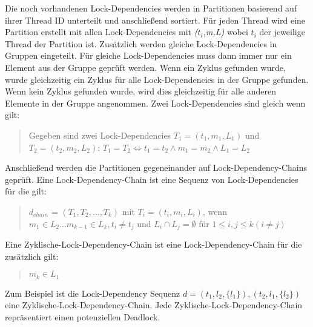 Die noch vorhandenen Lock-Dependencies werden in Partitionen basierend auf ihrer
Thread ID unterteilt und anschließend sortiert. Für jeden Thread wird eine
Partition erstellt mit allen Lock-Dependencies mit \textit{($t_i$,m,L)} wobei
\textit{$t_i$} der jeweilige Thread der Partition ist. Zusätzlich werden gleiche
Lock-Dependencies in Gruppen eingeteilt. Für gleiche Lock-Dependencies muss dann
immer nur ein Element aus der Gruppe geprüft werden. Wenn ein Zyklus gefunden
wurde, wurde gleichzeitig ein Zyklus für alle Lock-Dependencies in der Gruppe
gefunden. Wenn kein Zyklus gefunden wurde, wird dies gleichzeitig für alle
anderen Elemente in der Gruppe angenommen. Zwei Lock-Dependencies sind gleich
wenn gilt:
\begin{quote}
  Gegeben sind zwei Lock-Dependencies \textit{$T_1 = (t_1, m_1, L_1)$} und
  \textit{$T_2 = (t_2, m_2, L_2)$}: $T_1 = T_2 \Leftrightarrow t_1 = t_2 \land
  m_1 = m_2 \land L_1 = L_2 $
\end{quote}
Anschließend werden die Partitionen gegeneinander auf Lock-Dependency-Chains
geprüft. Eine Lock-Dependency-Chain ist eine Sequenz von Lock-Dependencies für
die gilt:
\begin{quote}
  \textbf{$d_{chain}$} = $(T_1, T_2, \dots , T_k)$ mit $T_i = (t_i, m_i, L_i)$,
  wenn $m_1 \in L_2 \dots m_{k-1} \in L_k, t_i \neq t_j$ und $L_i \cap L_j =
  \emptyset$ für $1 \leq i, j \leq k (i \neq j)$
\end{quote}
Eine Zyklische-Lock-Dependency-Chain ist eine Lock-Dependency-Chain für die
zusätzlich gilt:
\begin{quote}
  $m_k \in L_1$
\end{quote}
Zum Beispiel ist die Lock-Dependency Sequenz \textit{$d = (t_1, l_2, \{l_1\}),
(t_2, l_1, \{l_2\})$} eine Zyklische-Lock-Dependency-Chain. Jede
Zyklische-Lock-Dependency-Chain repräsentiert einen potenziellen Deadlock.